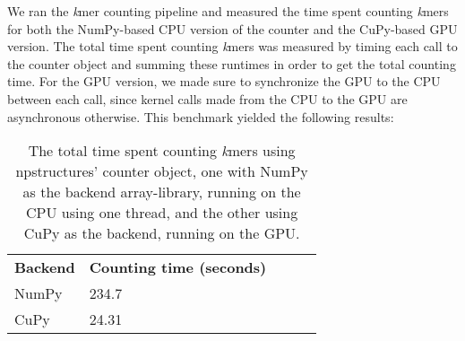 We ran the \textit{k}mer counting pipeline and measured the time spent counting \textit{k}mers for both the NumPy-based CPU version of the counter and the CuPy-based GPU version.
The total time spent counting \textit{k}mers was measured by timing each call to the counter object and summing these runtimes in order to get the total counting time.
For the GPU version, we made sure to synchronize the GPU to the CPU between each call, since kernel calls made from the CPU to the GPU are asynchronous otherwise.
This benchmark yielded the following results: 

\begin{table}[H]
\begin{center}
\begin{tabular}{lllll}
\multicolumn{1}{l|}{\textbf{Backend}} & \multicolumn{1}{l}{\textbf{Counting time (seconds)}} &  \\ \cline{1-2}
\multicolumn{1}{l|}{NumPy} & \multicolumn{1}{l}{234.7} &  \\
\multicolumn{1}{l|}{CuPy} & \multicolumn{1}{l}{24.31}
\end{tabular}
\end{center}
\caption{
  The total time spent counting \textit{k}mers using npstructures' counter object, one with NumPy as the backend array-library, running on the CPU using one thread, and the other using CuPy as the backend, running on the GPU.
}
\label{methods:initial_testing:tables:benchmark}
\end{table}

